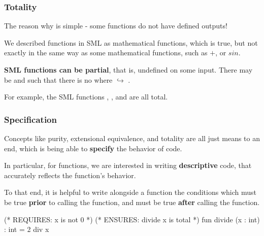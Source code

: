 \documentclass[aspectratio=169, handout]{beamer}
\begin{document}
\begin{frame}[fragile]
  \frametitle{Totality}

  The reason why is simple - some functions do not have defined outputs!

  \pause
  \vspace{\fill}

  We described functions in SML as mathematical functions, which is true, but not exactly in the
  same way as some mathematical functions, such as $+$, or $sin$.

  \pause
  \vspace{5pt}

  \textbf{SML functions can be partial}, that is, undefined on some input. There may be 
  and  such that there is no  where  $\hookrightarrow$ .

  \pause
  \vspace{\fill}


  \vspace{5pt}

  For example, the SML functions \code{+}, , and \code{^} are all total.
\end{frame}

\begin{frame}[fragile]
  \frametitle{Specification}

  Concepts like purity, extensional equivalence, and totality are all just means to
  an end, which is being able to \textbf{specify} the behavior of code.

  \pause
  \vspace{\fill}

  In particular, for functions, we are interested in writing \textbf{descriptive} code,
  that accurately reflects the function's behavior.

  \pause
  \vspace{5pt}

  To that end, it is helpful to write alongside a function the conditions which
  must be true \textbf{prior} to calling the function, and must be true \textbf{after}
  calling the function.

  \pause
  \vspace{\fill}

  \begin{codeblock}
    (* REQUIRES: x is not 0 *)
    (* ENSURES: divide x is total *)
    fun divide (x : int) : int = 2 div x
  \end{codeblock}
\end{frame}
\end{document}
